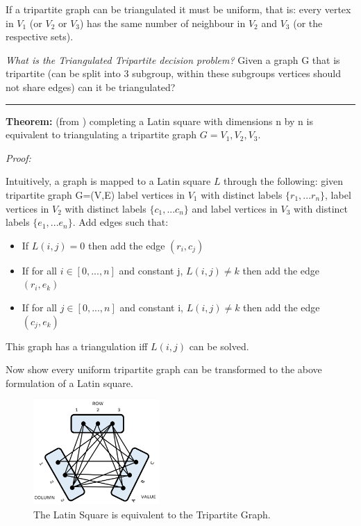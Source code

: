 \documentclass[a4paper,11pt]{report}
\newcounter{row}
\newcounter{col}
\newcounter{rowb}
\newcounter{colb}
\newcommand\setrowb[3]{
  \setcounter{colb}{1}
  \foreach \n in {#1, #2, #3} {
    \edef\x{\value{colb} - 0.5}
    \edef\y{3.5 - \value{rowb}}
    \node[anchor=center] at (\x, \y) {\n};
    \stepcounter{colb}
  }
  \stepcounter{rowb}
}
\begin{document}
If a tripartite graph can be triangulated it must be uniform, that is: every vertex in $V_1$ (or $V_2$ or $V_3$) has the same number of neighbour in $V_2$ and $V_3$ (or the respective sets).

\textit{What is the Triangulated Tripartite decision problem?} Given a graph G that is tripartite (can be split into 3 subgroup, within these subgroups vertices should not share edges) can it be triangulated?

\noindent\rule{4cm}{0.4pt}

\textbf{Theorem:} (from \cite{lsttg}) completing a Latin square with dimensions n by n is equivalent to triangulating a tripartite graph $G= V_1, V_2, V_3$.

\textit{Proof:} 

Intuitively, a graph is mapped to a Latin square $L$ through the following: 
given tripartite graph G=(V,E) label vertices in $V_1$ with distinct labels $\{r_1,...r_n\}$, label vertices in $V_2$ with distinct labels $\{c_1,...c_n\}$ and label vertices in $V_3$ with distinct labels $\{e_1,...e_n\}$. Add edges such that:
\begin{itemize}
\item{If $L(i,j) = 0$ then add the edge $(r_i,c_j)$ }
\item{If for all $i \in [0,...,n]$ and constant j, $L(i,j) \neq k$ then add the edge $(r_i,e_k)$}
\item{If for all $j \in [0,...,n]$ and constant i, $L(i,j) \neq k$ then add the edge $(c_j,e_k)$}
\end{itemize}
This graph has a triangulation iff $L(i,j)$ can be solved.

Now show every uniform tripartite graph can be transformed to the above formulation of a Latin square.

\begin{figure}[h!]
\centering
{}

\includegraphics[height=40mm]{figures/ttg.png}
\caption{The Latin Square is equivalent to the Tripartite Graph.}
\end{figure}
\end{document}
